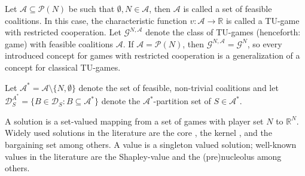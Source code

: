 \documentclass[a4paper,12pt]{article}
\theoremstyle{definition}
\theoremstyle{remark}
\begin{document}
Let $\mathcal{A} \subseteq \mathcal{P} (N)$ be such that $\emptyset,N \in \mathcal{A}$, then $\mathcal{A}$ is called a set of feasible coalitions.  In this case, the characteristic function $v \colon \mathcal{A} \to \mathbb{R}$ is called a TU-game with restricted cooperation. Let $\mathcal{G}^{N,\mathcal{A}}$ denote the class of TU-games (henceforth: game) with feasible coalitions $\mathcal{A}$. If $\mathcal{A} = \mathcal{P} (N)$, then $\mathcal{G}^{N,\mathcal{A}} = \mathcal{G}^N$, so every introduced concept for games with restricted cooperation is a generalization of a concept for classical TU-games.

Let $\mathcal{A}^*=\mathcal{A}\setminus \{ N, \emptyset \}$ denote the set of feasible, non-trivial coalitions and let $\mathcal{D}_S^{A^*} = \{ B\in \mathcal{D}_S \colon B\subseteq \mathcal{A}^* \}$ denote the $\mathcal{A}^*$-partition set of $S\in \mathcal{A}^*$.


A solution is a set-valued mapping from a set of games with player set $N$ to $\mathbb{R}^N$. Widely used solutions in the literature are the core \citep{Shapley1955,Gillies1959}, the kernel \citep{DavisMaschler1965}, and the  bargaining set \citep{AumannMaschler1964} among others. A value is a singleton valued solution; well-known values in the literature are the Shapley-value \citep{Shapley1953} and the (pre)nucleolus \citep{Schmeidler1969} among others.

\end{document}
